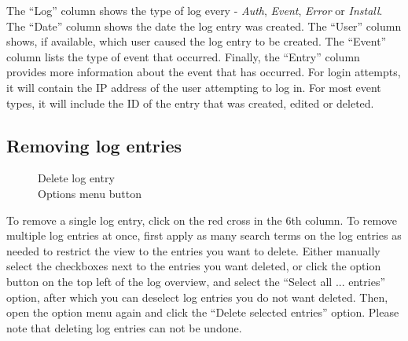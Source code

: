 \documentclass[a4paper,oneside,openany,12pt]{memoir}
\begin{document}
The ``Log'' column shows the type of log every - \emph{Auth}, \emph{Event}, \emph{Error} or \emph{Install}.
The ``Date'' column shows the date the log entry was created.
The ``User'' column shows, if available, which user caused the log entry to be created.
The ``Event'' column lists the type of event that occurred.
Finally, the ``Entry'' column provides more information about the event that has occurred.
For login attempts, it will contain the IP address of the user attempting to log in.
For most event types, it will include the ID of the entry that was created, edited or deleted.



\subsection{Removing log entries}
\begin{figure} %
  \vspace{-25pt}
  \begin{framed}
     Delete log entry\\
     Options menu button
  \end{framed}
\end{figure}
To remove a single log entry, click on the red cross in the 6th column.
To remove multiple log entries at once, first apply as many search terms on the log entries as needed to restrict the view to the entries you want to delete.
Either manually select the checkboxes next to the entries you want deleted,
 or click the option button on the top left of the log overview, and select the ``Select all ... entries'' option,
 after which you can deselect log entries you do not want deleted.
Then, open the option menu again and click the ``Delete selected entries'' option.
Please note that deleting log entries can not be undone.
\end{document}
